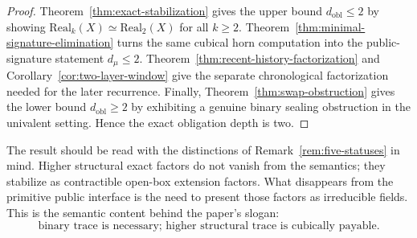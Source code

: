 \begin{proof}
Theorem~\ref{thm:exact-stabilization} gives the upper bound
\(d_{\mathrm{obl}}\leq 2\) by showing
\(\mathrm{Real}_k(X)\simeq\mathrm{Real}_2(X)\) for all \(k\geq 2\).  Theorem~\ref{thm:minimal-signature-elimination}
turns the same cubical horn computation into the public-signature statement
\(d_\mu\leq 2\).  Theorem~\ref{thm:recent-history-factorization} and
Corollary~\ref{cor:two-layer-window} give the separate chronological factorization needed
for the later recurrence.  Finally, Theorem~\ref{thm:swap-obstruction} gives the lower bound
\(d_{\mathrm{obl}}\geq 2\) by exhibiting a genuine binary sealing obstruction in the univalent
setting.  Hence the exact obligation depth is two.
\end{proof}

The result should be read with the distinctions of Remark~\ref{rem:five-statuses} in mind.
Higher structural exact factors do not vanish from the semantics; they stabilize as
contractible open-box extension factors.  What disappears from the primitive public
interface is the need to present those factors as irreducible fields.  This is the semantic
content behind the paper's slogan:
\[
  \text{binary trace is necessary; higher structural trace is cubically payable.}
\]
